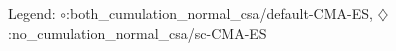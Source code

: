 Legend: {\color{CornflowerBlue}$\circ$}:both\_cumulation\_normal\_csa/default-CMA-ES, {\color{Orange}$\diamondsuit$}:no\_cumulation\_normal\_csa/sc-CMA-ES